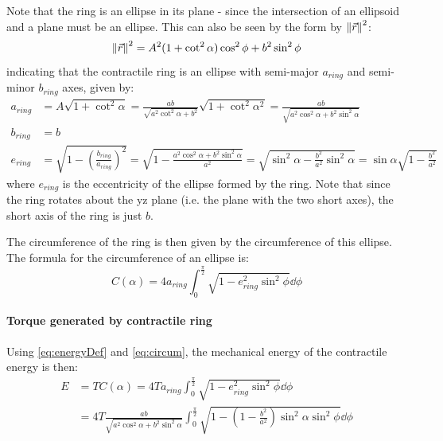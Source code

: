Note that the ring is an ellipse in its plane - since the intersection of an ellipsoid and a plane must be an ellipse. This can also be seen by the form by $\norm{\Vec{r}}^2$:
\begin{equation*}
    \norm{\Vec{r}}^2 = A^2(1 + \cot^2\alpha)\cos^2\phi + b^2\sin^2\phi
\end{equation*}
indicating that the contractile ring is an ellipse with semi-major $a_{ring}$ and semi-minor $b_{ring}$ axes, given by:
\begin{align*}
    a_{ring} &= A\sqrt{1 + \cot^2\alpha} = \frac{ab}{\sqrt{a^2\cot^2\alpha + b^2}}\sqrt{1 + \cot^2\alpha^2} = \frac{ab}{\sqrt{a^2\cos^2\alpha + b^2\sin^2\alpha}}\\
    b_{ring} &= b \\
    e_{ring} &= \sqrt{1 - \left(\frac{b_{ring}}{a_{ring}}\right)^2} = \sqrt{1 - \frac{a^2\cos^2\alpha + b^2\sin^2\alpha}{a^2}} = \sqrt{\sin^2\alpha - \frac{b^2}{a^2}\sin^2\alpha} = \sin\alpha\sqrt{1 - \frac{b^2}{a^2}}
\end{align*}
where $e_{ring}$ is the eccentricity of the ellipse formed by the ring. Note that since the ring rotates about the yz plane (i.e. the plane with the two short axes), the short axis of the ring is just $b$.

The circumference of the ring is then given by the circumference of this ellipse. The formula for the circumference of an ellipse is:
\begin{equation} \label{eq:circum}
    C(\alpha) = 4a_{ring}\int_0^{\frac{\pi}{2}} \sqrt{1 - e_{ring}^2\sin^2\phi} \dd{\phi}
\end{equation}

\paragraph{Torque generated by contractile ring}
Using \eqref{eq:energyDef} and \eqref{eq:circum}, the mechanical energy of the contractile energy is then:
\begin{align*}
    E &= TC(\alpha) = 4Ta_{ring}\int_0^{\frac{\pi}{2}} \sqrt{1 - e_{ring}^2\sin^2\phi} \dd{\phi}\\
    &= 4T\frac{ab}{\sqrt{a^2\cos^2\alpha + b^2\sin^2\alpha}}\int_0^{\frac{\pi}{2}} \sqrt{1 - \left(1 - \frac{b^2}{a^2}\right)\sin^2\alpha\sin^2\phi} \dd{\phi}
\end{align*}

